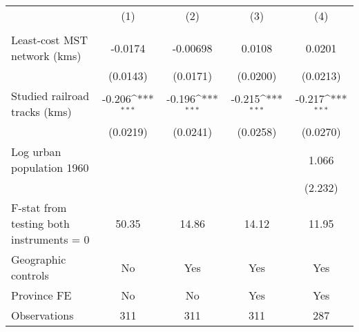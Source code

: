{
\def\sym#1{\ifmmode^{#1}\else\(^{#1}\)\fi}
\begin{tabular}{l*{4}{c}}
\hline\hline
                &\multicolumn{1}{c}{(1)}&\multicolumn{1}{c}{(2)}&\multicolumn{1}{c}{(3)}&\multicolumn{1}{c}{(4)}\\
                &\multicolumn{1}{c}{}&\multicolumn{1}{c}{}&\multicolumn{1}{c}{}&\multicolumn{1}{c}{}\\
\hline
Least-cost MST network (kms)&  -0.0174         & -0.00698         &   0.0108         &   0.0201         \\
                & (0.0143)         & (0.0171)         & (0.0200)         & (0.0213)         \\
[1em]
Studied railroad tracks (kms)&   -0.206\sym{***}&   -0.196\sym{***}&   -0.215\sym{***}&   -0.217\sym{***}\\
                & (0.0219)         & (0.0241)         & (0.0258)         & (0.0270)         \\
[1em]
Log urban population 1960&                  &                  &                  &    1.066         \\
                &                  &                  &                  &  (2.232)         \\
\hline
F-stat from testing both instruments = 0&    50.35         &    14.86         &    14.12         &    11.95         \\
Geographic controls&       No         &      Yes         &      Yes         &      Yes         \\
Province FE     &       No         &       No         &      Yes         &      Yes         \\
Observations    &      311         &      311         &      311         &      287         \\
\hline\hline
\end{tabular}
}
